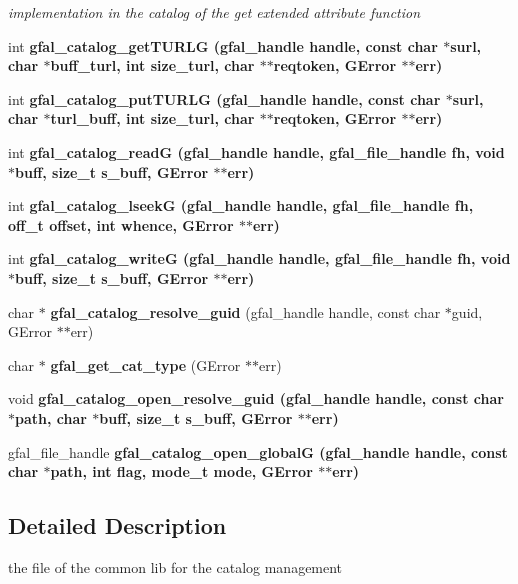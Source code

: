 \begin{CompactItemize}
\begin{CompactList}\small\item\em implementation in the catalog of the get extended attribute function \item\end{CompactList}\item 
int \bf{gfal\_\-catalog\_\-get\-TURLG} (gfal\_\-handle handle, const char $\ast$surl, char $\ast$buff\_\-turl, int size\_\-turl, char $\ast$$\ast$reqtoken, GError $\ast$$\ast$err)
\item 
int \bf{gfal\_\-catalog\_\-put\-TURLG} (gfal\_\-handle handle, const char $\ast$surl, char $\ast$turl\_\-buff, int size\_\-turl, char $\ast$$\ast$reqtoken, GError $\ast$$\ast$err)
\item 
int \bf{gfal\_\-catalog\_\-read\-G} (gfal\_\-handle handle, gfal\_\-file\_\-handle fh, void $\ast$buff, size\_\-t s\_\-buff, GError $\ast$$\ast$err)
\item 
int \bf{gfal\_\-catalog\_\-lseek\-G} (gfal\_\-handle handle, gfal\_\-file\_\-handle fh, off\_\-t offset, int whence, GError $\ast$$\ast$err)
\item 
int \bf{gfal\_\-catalog\_\-write\-G} (gfal\_\-handle handle, gfal\_\-file\_\-handle fh, void $\ast$buff, size\_\-t s\_\-buff, GError $\ast$$\ast$err)
\item 
char $\ast$ \textbf{gfal\_\-catalog\_\-resolve\_\-guid} (gfal\_\-handle handle, const char $\ast$guid, GError $\ast$$\ast$err)\label{gfal__common__catalog_8c_4955825d7c275f3dfae9a57232642370}

\item 
char $\ast$ \textbf{gfal\_\-get\_\-cat\_\-type} (GError $\ast$$\ast$err)\label{gfal__common__catalog_8c_c20aa1a376c802d0c60208854537851e}

\item 
void \bf{gfal\_\-catalog\_\-open\_\-resolve\_\-guid} (gfal\_\-handle handle, const char $\ast$path, char $\ast$buff, size\_\-t s\_\-buff, GError $\ast$$\ast$err)
\item 
gfal\_\-file\_\-handle \bf{gfal\_\-catalog\_\-open\_\-global\-G} (gfal\_\-handle handle, const char $\ast$path, int flag, mode\_\-t mode, GError $\ast$$\ast$err)
\end{CompactItemize}


\subsection{Detailed Description}
the file of the common lib for the catalog management 

